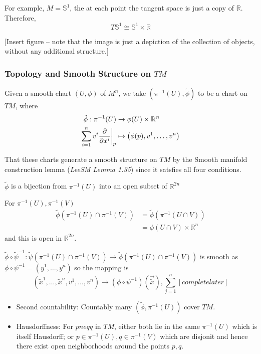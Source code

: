 \documentclass{article}
\newcommand{\R}{\mathbb{R}}
\newcommand{\restr}[2]{{%
  \left.\kern-\nulldelimiterspace %
  #1 %
  \vphantom{\big|} %
  \right|_{#2} %
  }}
\begin{document}
\vskip 0.5cm
For example, $M = \mathbb{S}^1$, the at each point the tangent space is just a copy of $\R$. Therefore, 
\[ T \mathbb{S}^1 \cong \mathbb{S}^1 \times \R \]

[Insert figure -- note that the image is just a depiction of the collection of objects, without any additional structure.]

\vskip 1cm
\subsubsection{Topology and Smooth Structure on $TM$}

Given a smooth chart $(U, \phi)$ of $M^n$, we take $\left( \pi^{-1}(U), \tilde{\phi} \right)$ to be a chart on $TM$, where 
\begin{align*}
  \tilde{\phi} : \pi^{-1}(U) &\rightarrow \phi(U) \times \R^n  \\
  \sum_{i = 1}^{n} v^i \restr{\frac{\partial}{\partial x^i}}{p} &\mapsto \left( \phi(p), v^1, \dots, v^n \right)
\end{align*}

\vskip 0.25cm
That these charts generate a smooth structure on $TM$ by the Smooth manifold construction lemma (\emph{LeeSM Lemma 1.35}) since it satsfies all four conditions.

   $\tilde{\phi}$ is a bijection from $\pi^{-1}(U)$ into an open subset of $\R^{2n}$
  
   For $\pi^{-1}(U), \pi^{-1}(V)$ 
  \begin{align*}
    \tilde{\phi}(\pi^{-1}(U) \cap \pi^{-1}(V)) &= \tilde{\phi}( \pi^{-1}(U \cap V)) \\
    &= \phi(U \cap V) \times \R^n
  \end{align*}
  and this is open in $\R^{2n}$.


   $\tilde{\phi} \circ \tilde{\psi}^{-1} : \tilde{\psi}(\pi^{-1}(U) \cap \pi^{-1}(V)) \rightarrow \tilde{\phi}(\pi^{-1}(U) \cap \pi^{-1}(V))$ is smooth as $\phi \circ \psi^{-1} = (\overline{y}^1, \dots, \overline{y}^n)$ so the mapping is 
  \[ \left( \tilde{x}^1, \dots, \tilde{x}^n, v^1, \dots, v^n \right) \rightarrow \left( \phi \circ \psi^{-1} \right) (\vec{\tilde{x}}), \sum_{j = 1}^n [complete later] \]

\begin{itemize}
  \item Second countability: Countably many $\left( \tilde{\phi}, \pi^{-1}(U) \right)$ cover $TM$.
  \item Hausdorffness: For $p neq q$ in $TM$, either both lie in the same $\pi^{-1}(U)$ which is itself Hausdorff; or $p \in \pi^{-1}(U), q \in \pi^{-1}(V)$ which are disjonit and hence there exist open neighborhoods around the points $p, q$.
\end{itemize}
\end{document}

